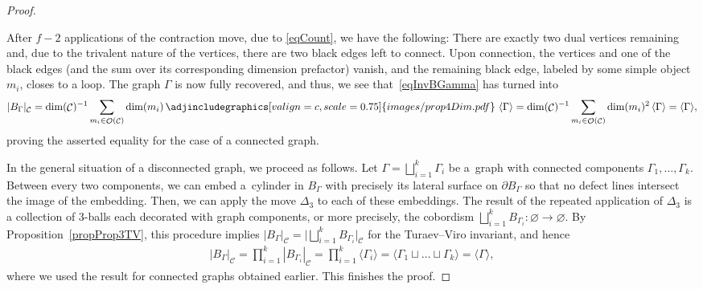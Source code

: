 \documentclass[pdftex]{sigma}
\DeclareMathOperator{\calc}{\mathcal{C}}
\DeclareMathOperator{\calo}{\mathcal{O}}
\numberwithin{equation}{section}
\theoremstyle{definition}
\begin{document}
\begin{proof}
\begin{enumerate}
 \end{enumerate}
 After $f-2$ applications of the contraction move, due to \eqref{eqCount}, we have the following: There are exactly two dual vertices remaining and, due to the trivalent nature of the vertices, there are two black edges left to connect. Upon connection, the vertices and one of the black edges (and the sum over its corresponding dimension prefactor) vanish, and the remaining black edge, labeled by some simple object~$m_i$, closes to a loop. The graph $\Gamma$ is now fully recovered, and thus, we see that~\eqref{eqInvBGamma} has turned into
 \begin{align*}
 |B_{\Gamma}|_{\calc} = \dim(\calc)^{-1}\sum_{m_i \in \calo(\calc)} \dim(m_i) \, \adjincludegraphics[valign=c, scale = 0.75]{images/prop4Dim.pdf} \, \, \langle \Gamma \rangle = \dim(\calc)^{-1}\sum_{m_i \in \calo(\calc)} \dim(m_i)^2 \, \langle \Gamma \rangle = \langle \Gamma \rangle,
 \end{align*}
 proving the asserted equality for the case of a connected graph.

 In the general situation of a disconnected graph, we proceed as follows. Let $\Gamma = \bigsqcup_{i = 1}^k \Gamma_i$ be a~graph with connected components $\Gamma_1, \dots, \Gamma_k$. Between every two components, we can embed a~cylinder in $B_{\Gamma}$ with precisely its lateral surface on $\partial B_{\Gamma}$ so that no defect lines intersect the image of the embedding. Then, we can apply the move $\Delta_3$ to each of these embeddings. The result of the repeated application of $\Delta_3$ is a collection of 3-balls each decorated with graph components, or more precisely, the cobordism $\bigsqcup_{i = 1}^k B_{\Gamma_i}\colon \varnothing \rightarrow \varnothing$. By Proposition~\ref{propProp3TV}, this procedure implies $|B_{\Gamma}|_{\calc} = \bigl|\bigsqcup_{i = 1}^k B_{\Gamma_i}\bigr|_{\calc}$ for the Turaev--Viro invariant, and hence
 \begin{align*}
 |B_{\Gamma}|_{\calc} = \prod_{i = 1}^k|B_{\Gamma_i}|_{\calc} = \prod_{i = 1}^k\langle \Gamma_i\rangle = \langle \Gamma_1 \sqcup \dots \sqcup \Gamma_k \rangle = \langle \Gamma \rangle,
 \end{align*}
 where we used the result for connected graphs obtained earlier. This finishes the proof.
\end{proof}
\end{document}
